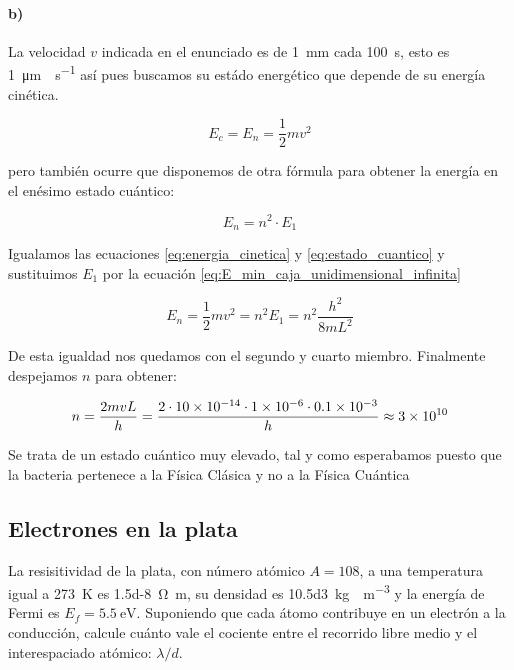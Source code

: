 \documentclass[12pt, a4paper]{article}
\begin{document}
        \paragraph{b)} La velocidad $v$ indicada en el enunciado es de \SI{1}{\milli\meter} cada \SI{100}{\second}, esto
        es \SI{1}{\micro\meter\cdot\second^{-1}} así pues buscamos su estádo energético que depende de su energía cinética.

        \begin{equation} \label{eq:energia_cinetica}
            E_c = E_n = \frac{1}{2}mv^2
        \end{equation}

        pero también ocurre que disponemos de otra fórmula para
        obtener la energía en el enésimo estado cuántico:

        \begin{equation}    \label{eq:estado_cuantico}
            E_n = n^2 \cdot E_1
        \end{equation}

        Igualamos las ecuaciones \ref{eq:energia_cinetica} y \ref{eq:estado_cuantico} y
        sustituimos $E_1$ por la ecuación \ref{eq:E_min_caja_unidimensional_infinita}

        \begin{equation*}
            E_n = \frac{1}{2}mv^2 = n^2 E_1 = n^2 \frac{h^2}{8mL^2}
        \end{equation*}

        De esta igualdad nos quedamos con el segundo y cuarto miembro.
        Finalmente despejamos $n$ para obtener:

        $$ n = \frac{2mvL}{h} = \frac{\num{2}\cdot\num{10d-14}\cdot\num{1d-6}\cdot\num{0.1d-3}}{h} \approx \num{3d10} $$

        Se trata de un estado cuántico muy elevado, tal y como esperabamos puesto que la bacteria pertenece a la
        Física Clásica y no a la Física Cuántica


        \subsection{Electrones en la plata}
        La resisitividad de la plata, con número atómico $A=\num{108}$, a una temperatura igual
        a \SI{273}{\kelvin} es \SI{1.5d-8}{\ohm\meter}, su densidad es \SI{10.5d3}{\kilo\gram\cdot\meter^{-3}}
        y la energía de Fermi es $E_f = \SI{5.5}{\electronvolt}$. Suponiendo que cada átomo contribuye
        en un electrón a la conducción, calcule cuánto vale el cociente entre el recorrido libre medio
        y el interespaciado atómico: $\lambda/d$.
\end{document}
